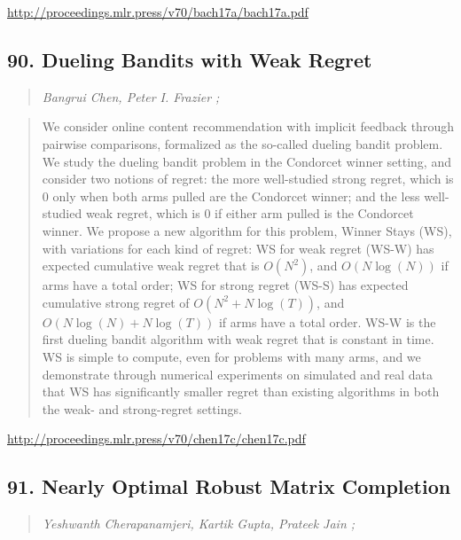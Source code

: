 \documentclass{article}
\begin{document}
\href{http://proceedings.mlr.press/v70/bach17a/bach17a.pdf}{http://proceedings.mlr.press/v70/bach17a/bach17a.pdf}

\subsection{90. Dueling Bandits with Weak Regret}

\begin{quote}
\footnotesize{\textit{Bangrui Chen, Peter I. Frazier ;}}
\end{quote}

\begin{quote}
    We consider online content recommendation with implicit feedback through pairwise comparisons, formalized as the so-called dueling bandit problem. We study the dueling bandit problem in the Condorcet winner setting, and consider two notions of regret: the more well-studied strong regret, which is 0 only when both arms pulled are the Condorcet winner; and the less well-studied weak regret, which is 0 if either arm pulled is the Condorcet winner. We propose a new algorithm for this problem, Winner Stays (WS), with variations for each kind of regret: WS for weak regret (WS-W) has expected cumulative weak regret that is $O(N^2)$, and $O(N\log(N))$ if arms have a total order; WS for strong regret (WS-S) has expected cumulative strong regret of $O(N^2 + N \log(T))$, and $O(N\log(N)+N\log(T))$ if arms have a total order. WS-W is the first dueling bandit algorithm with weak regret that is constant in time. WS is simple to compute, even for problems with many arms, and we demonstrate through numerical experiments on simulated and real data that WS has significantly smaller regret than existing algorithms in both the weak- and strong-regret settings.  \end{quote}

\href{http://proceedings.mlr.press/v70/chen17c/chen17c.pdf}{http://proceedings.mlr.press/v70/chen17c/chen17c.pdf}

\subsection{91. Nearly Optimal Robust Matrix Completion}

\begin{quote}
\footnotesize{\textit{Yeshwanth Cherapanamjeri, Kartik Gupta, Prateek Jain ;}}
\end{quote}
\end{document}
